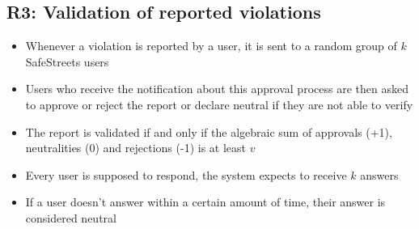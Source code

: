 \subsection{R3: Validation of reported violations}
\begin{itemize}
    \item Whenever a violation is reported by a user, it is sent to a random group of $k$ SafeStreets users
    \item Users who receive the notification about this approval process are then asked to approve or reject the report or declare neutral if they are not able to verify
    \item The report is validated if and only if the algebraic sum of approvals (+1), neutralities (0) and rejections (-1) is at least $v$
    \item Every user is supposed to respond, the system expects to receive $k$ answers
    \item If a user doesn't answer within a certain amount of time, their answer is considered neutral
\end{itemize}
